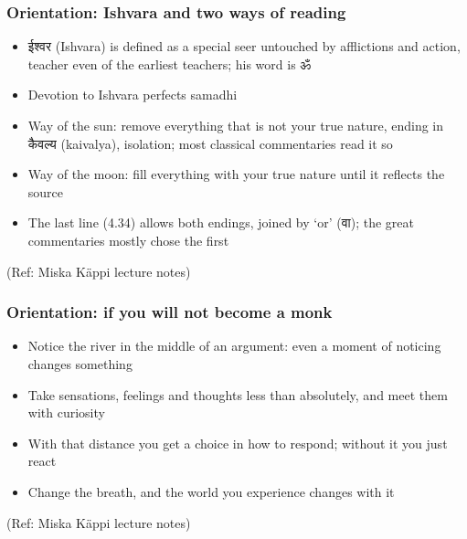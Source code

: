 \begin{frame}[fragile]\frametitle{Orientation: Ishvara and two ways of reading}

	\begin{itemize}
	\item ईश्वर (Ishvara) is defined as a special seer untouched by afflictions and action, teacher even of the earliest teachers; his word is ॐ
	\item Devotion to Ishvara perfects samadhi
	\item Way of the sun: remove everything that is not your true nature, ending in कैवल्य (kaivalya), isolation; most classical commentaries read it so
	\item Way of the moon: fill everything with your true nature until it reflects the source
	\item The last line (4.34) allows both endings, joined by `or' (वा); the great commentaries mostly chose the first
	\end{itemize}

\tiny{(Ref: Miska Käppi lecture notes)}

\end{frame}

\begin{frame}[fragile]\frametitle{Orientation: if you will not become a monk}

	\begin{itemize}
	\item Notice the river in the middle of an argument: even a moment of noticing changes something
	\item Take sensations, feelings and thoughts less than absolutely, and meet them with curiosity
	\item With that distance you get a choice in how to respond; without it you just react
	\item Change the breath, and the world you experience changes with it
	\end{itemize}

\tiny{(Ref: Miska Käppi lecture notes)}

\end{frame}



